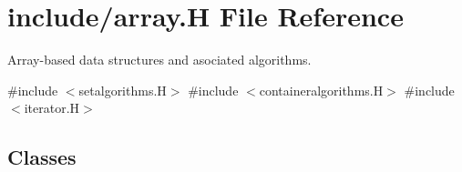 \hypertarget{array_8_h}{}\section{include/array.H File Reference}
\label{array_8_h}


Array-\/based data structures and asociated algorithms.  


{\ttfamily \#include $<$setalgorithms.\+H$>$}\newline
{\ttfamily \#include $<$containeralgorithms.\+H$>$}\newline
{\ttfamily \#include $<$iterator.\+H$>$}\newline
\subsection*{Classes}
